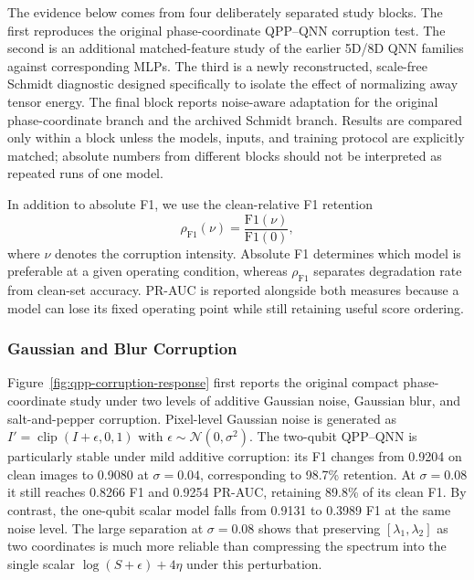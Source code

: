 \documentclass[11pt]{article}
\begin{document}
The evidence below comes from four deliberately separated study blocks.  The
first reproduces the original phase-coordinate QPP--QNN corruption test.  The
second is an additional matched-feature study of the earlier 5D/8D QNN
families against corresponding MLPs.  The third is a newly reconstructed,
scale-free Schmidt diagnostic designed specifically to isolate the effect of
normalizing away tensor energy.  The final block reports noise-aware adaptation
for the original phase-coordinate branch and the archived Schmidt branch.
Results are compared only within a block unless the models, inputs, and
training protocol are explicitly matched; absolute numbers from different
blocks should not be interpreted as repeated runs of one model.

In addition to absolute F1, we use the clean-relative F1 retention
\begin{equation}
    \rho_{\mathrm{F1}}(\nu)
    =\frac{\mathrm{F1}(\nu)}{\mathrm{F1}(0)},
    \label{eq:f1-retention}
\end{equation}
where $\nu$ denotes the corruption intensity.  Absolute F1 determines which
model is preferable at a given operating condition, whereas
$\rho_{\mathrm{F1}}$ separates degradation rate from clean-set accuracy.
PR-AUC is reported alongside both measures because a model can lose its fixed
operating point while still retaining useful score ordering.

\subsubsection{Gaussian and Blur Corruption}
\label{sec:gaussian-blur}

Figure~\ref{fig:qpp-corruption-response} first reports the original compact
phase-coordinate study under two levels of additive Gaussian noise, Gaussian
blur, and salt-and-pepper corruption.  Pixel-level Gaussian noise is generated
as $I'=\operatorname{clip}(I+\epsilon,0,1)$ with
$\epsilon\sim\mathcal{N}(0,\sigma^2)$.  The two-qubit QPP--QNN is particularly
stable under mild additive corruption: its F1 changes from 0.9204 on clean
images to 0.9080 at $\sigma=0.04$, corresponding to 98.7\% retention.  At
$\sigma=0.08$ it still reaches 0.8266 F1 and 0.9254 PR-AUC, retaining 89.8\%
of its clean F1.  By contrast, the one-qubit scalar model falls from 0.9131 to
0.3989 F1 at the same noise level.  The large separation at $\sigma=0.08$
shows that preserving $[\lambda_1,\lambda_2]$ as two coordinates is much more
reliable than compressing the spectrum into the single scalar
$\log(S+\epsilon)+4\eta$ under this perturbation.
\end{document}
